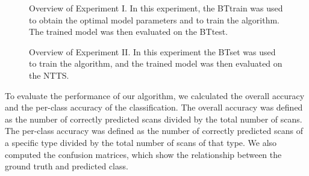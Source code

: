 \newpage
\begin{figure}[H]
\centering


\caption{Overview of Experiment I. In this experiment, the \gls{BTtrain} was used to obtain the optimal model parameters and to train the algorithm. The trained model was then evaluated on the \gls{BTtest}.}
\label{fig:brain_tumor_experiment}
\end{figure}

\begin{figure}[H]
\centering


\caption{Overview of Experiment II. In this experiment the \gls{BTset} was used to train the algorithm, and the trained model was then evaluated on the \gls{NTTS}.}
\label{fig:adni_experiment}
\end{figure}

To evaluate the performance of our algorithm, we calculated the overall accuracy and the per-class accuracy of the classification.
The overall accuracy was defined as the number of correctly predicted \glspl{scan} divided by the total number of \glspl{scan}.
The per-class accuracy was defined as the number of correctly predicted \glspl{scan} of a specific \gls{type} divided by the total number of \glspl{scan} of that \gls{type}.
We also computed the confusion matrices, which show the relationship between the ground truth and predicted \gls{class}.

